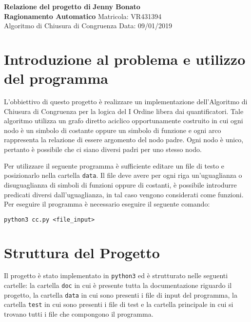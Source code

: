 \documentclass[a4paper, 11pt]{article}
\begin{document}
\noindent
\large\textbf{Relazione del progetto di} \hfill \textbf{Jenny Bonato} \\
\large\textbf{Ragionamento Automatico} \hfill Matricola: VR431394 \\
Algoritmo di Chiusura di Congruenza \hfill Data: 09/01/2019 \\

\section*{Introduzione al problema e utilizzo del programma}
L'obbiettivo di questo progetto è realizzare un implementazione dell'Algoritmo di Chiusura di Congruenza per la logica del I Ordine libera dai quantificatori. Tale algoritmo utilizza un grafo diretto aciclico opportunamente costruito in cui ogni nodo è un simbolo di costante oppure un simbolo di funzione e ogni arco rappresenta la relazione di essere argomento del nodo padre. Ogni nodo è unico, pertanto è possibile che ci siano diversi padri per uno stesso nodo.

Per utilizzare il seguente programma è sufficiente editare un file di testo e posizionarlo nella cartella \verb|data|. 
Il file deve avere per ogni riga un'uguaglianza o disuguaglianza di simboli di funzioni  oppure di costanti, è possibile introdurre predicati diversi dall'uguaglianza, in tal caso vengono considerati come funzioni.
Per eseguire il programma è necessario eseguire il seguente comando:
\begin{verbatim}
python3 cc.py <file_input>
\end{verbatim} 

\section*{Struttura del Progetto}
Il progetto è stato implementato in \verb|python3| ed è strutturato nelle seguenti cartelle: la cartella \verb|doc| in cui è presente tutta la documentazione riguardo il progetto, la cartella \verb|data| in cui sono presenti i file di input del programma, la cartella \verb|test| in cui sono presenti i file di test e la cartella principale in cui si trovano tutti i file che compongono il programma.
\end{document}
